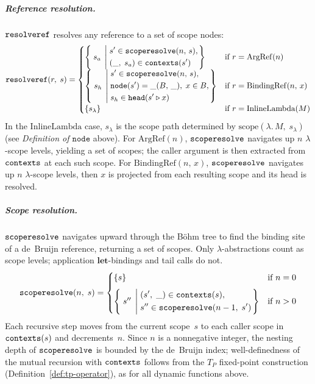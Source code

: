 \subparagraph{Reference resolution.}
$\mathtt{resolveref}$ resolves any reference to a set of scope nodes:
\begin{equation}\label{eq:lambda-resolve-ref}
  \mathtt{resolveref}(r,\; s) =
  \begin{cases}
    \left\{\; s_a \;\left|\;
      \begin{aligned}
        &s' \in \mathtt{scoperesolve}(n,\, s),\\
        &(\_,\; s_a) \in \mathtt{contexts}(s')
      \end{aligned}
    \right.\right\}
    & \text{if } r = \mathrm{ArgRef}(n) \\[6pt]
    \left\{\; s_h \;\left|\;
      \begin{aligned}
        &s' \in \mathtt{scoperesolve}(n,\, s),\\
        &\mathtt{node}(s') = \_(B,\, \_),\;
        x \in B,\\
        &s_h \in \mathtt{head}(s' \mathbin{\triangleright} x)
      \end{aligned}
    \right.\right\}
    & \text{if } r = \mathrm{BindingRef}(n,\, x) \\[6pt]
    \{s_{\lambda}\}
    & \text{if } r = \mathrm{InlineLambda}(M)
  \end{cases}
\end{equation}
In the $\mathrm{InlineLambda}$ case,
$s_\lambda$ is the scope path determined by
$\mathrm{scope}(\lambda.\,M,\; s_\lambda)$
(see \emph{Definition of $\mathtt{node}$} above).
For $\mathrm{ArgRef}(n)$,
$\mathtt{scoperesolve}$ navigates up $n$ $\lambda$-scope levels,
yielding a set of scopes;
the caller argument is then extracted from $\mathtt{contexts}$
at each such scope.
For $\mathrm{BindingRef}(n,\, x)$,
$\mathtt{scoperesolve}$ navigates up $n$ $\lambda$-scope levels,
then $x$ is projected from each resulting scope and its head is
resolved.

\subparagraph{Scope resolution.}
$\mathtt{scoperesolve}$ navigates upward through the B\"ohm tree
to find the binding site of a de~Bruijn reference,
returning a set of scopes.
Only $\lambda$-abstractions count as scope levels;
application $\mathbf{let}$-bindings and tail calls do not.
\begin{equation}\label{eq:lambda-scope}
  \mathtt{scoperesolve}(n,\; s) =
  \begin{cases}
    \{s\} & \text{if } n = 0 \\[6pt]
    \left\{\; s'' \;\left|\;
      \begin{aligned}
        &(s',\; \_) \in \mathtt{contexts}(s),\\
        &s'' \in \mathtt{scoperesolve}(n - 1,\; s')
      \end{aligned}
    \right.\right\}
    & \text{if } n > 0
  \end{cases}
\end{equation}
Each recursive step moves from the current scope~$s$ to
each caller scope in $\mathtt{contexts}(s)$
and decrements~$n$.
Since $n$ is a nonnegative integer, the nesting depth of
$\mathtt{scoperesolve}$ is bounded by the de~Bruijn index;
well-definedness of the mutual recursion with $\mathtt{contexts}$
follows from the $T_P$ fixed-point construction
(Definition~\ref{def:tp-operator}), as for all dynamic
functions above.

